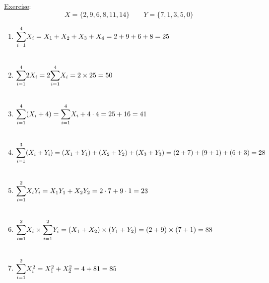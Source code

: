\documentclass{./../handout}
\begin{document}
\underline{Exercise}:
$$ X = \{2,9,6,8,11,14\} \quad \quad Y = \{7,1,3,5,0\}$$ 
\begin{enumerate}
\item $\mathlarger{\sum}_{i=1}^4 X_i = X_1 + X_2 + X_3 + X_4 = 2 + 9 + 6 + 8 = 25 $ \\~\\
\item $\mathlarger{\sum}_{i=1}^4 2 X_i = 2 \mathlarger{\sum}_{i=1}^4 X_i = 2 \times 25 = 50  $ \\~\\
\item $\mathlarger{\sum}_{i=1}^4 (X_i+4) = \mathlarger{\sum}_{i=1}^4 X_i + 4 \cdot 4 = 25+16 = 41 $ \\~\\
\item $\mathlarger{\sum}_{i=1}^3 (X_i+Y_i) = (X_1 + Y_1) + (X_2 + Y_2) + (X_3 + Y_3) = (2+7) + (9+1) + (6+3) = 28 $ \\~\\
\item $\mathlarger{\sum}_{i=1}^2 X_i Y_i = X_1 Y_1 + X_2 Y_2 = 2 \cdot 7 + 9 \cdot 1 = 23  $ \\~\\
\item $\mathlarger{\sum}_{i=1}^2 X_i \times \mathlarger{\sum}_{i=1}^2 Y_i = (X_1+X_2) \times (Y_1 +Y_2) = (2+9) \times (7+1) = 88 $ \\~\\
\item $\mathlarger{\sum}_{i=1}^2 X_i^2 = X_1^2 + X_2^2 = 4 +81 = 85$ \\~\\
\end{enumerate}
\end{document}
